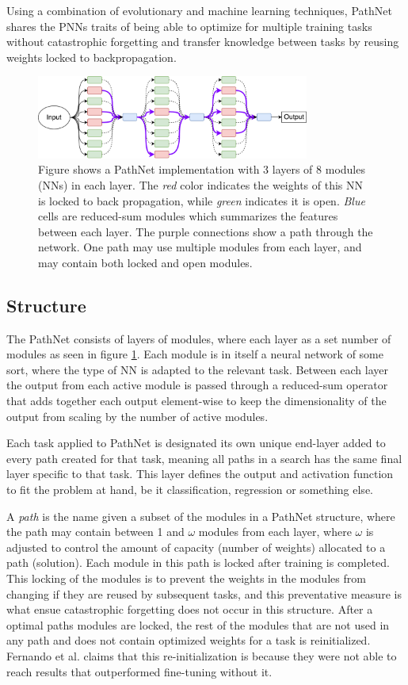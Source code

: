 Using a combination of evolutionary and machine learning techniques, PathNet shares the PNNs traits of being able to optimize for multiple training tasks without catastrophic forgetting and transfer knowledge between tasks by reusing weights locked to backpropagation.  
\begin{figure}[h]
    \centering
    \includegraphics[width=0.8\textwidth]{Chapters/Background/figures/PathNet.pdf}
    \caption{Figure shows a PathNet implementation with 3 layers of 8 modules (NNs) in each layer. The \textit{red} color indicates the weights of this NN is locked to back propagation, while \textit{green} indicates it is open. \textit{Blue} cells are reduced-sum modules which summarizes the features between each layer. The purple connections show a path through the network. One path may use multiple modules from each layer, and may contain both locked and open modules.}
    \label{fig:pathnet}
\end{figure}

\subsection{Structure}
The PathNet consists of layers of modules, where each layer as a set number of modules as seen in figure \ref{fig:pathnet}. Each module is in itself a neural network of some sort, where the type of NN is adapted to the relevant task. Between each layer the output from each active module is passed through a reduced-sum operator that adds together each output element-wise to keep the dimensionality of the output from scaling by the number of active modules. 

Each task applied to PathNet is designated its own unique end-layer added to every path created for that task, meaning all paths in a search has the same final layer specific to that task. This layer defines the output and activation function to fit the problem at hand, be it classification, regression or something else.  

A \textit{path} is the name given a subset of the modules in a PathNet structure, where the path may contain between 1 and \(\omega\) modules from each layer, where \(\omega\) is adjusted to control the amount of capacity (number of weights) allocated to a path (solution). Each module in this path is locked after training is completed. This locking of the modules is to prevent the weights in the modules from changing if they are reused by subsequent tasks, and this preventative measure is what ensue catastrophic forgetting does not occur in this structure. After a optimal paths modules are locked, the rest of the modules that are not used in any path and does not contain optimized weights for a task is reinitialized. Fernando et al. claims\cite{pathnet} that this re-initialization is because they were not able to reach results that outperformed fine-tuning without it.

